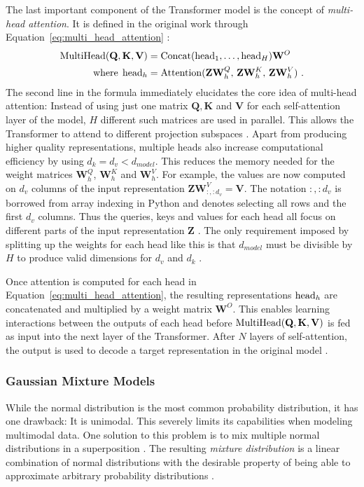 The last important component of the Transformer model is the concept of \emph{multi-head attention}. It is defined in the original work through Equation~\ref{eq:multi_head_attention} \cite{vaswaniAttentionAllYou2017}:
\begin{align}\label{eq:multi_head_attention}
    \operatorname{MultiHead} (\mathbf Q, \mathbf K, \mathbf V) & = \operatorname{Concat} (\operatorname{head}_1, \ldots, \operatorname{head}_H) \mathbf W^O \\
    \text{where} \; \operatorname{head}_h & = \operatorname{Attention} (\mathbf Z \mathbf W^Q_h , \, \mathbf Z \mathbf W^K_h, \, \mathbf Z \mathbf W^V_h)~. \nonumber
\end{align}
The second line in the formula immediately elucidates the core idea of multi-head attention: Instead of using just one matrix $\mathbf Q, \mathbf K$ and $\mathbf V$ for each self-attention layer of the model, $H$ different such matrices are used in parallel. This allows the Transformer to attend to different projection subspaces \cite{vaswaniAttentionAllYou2017}. Apart from producing higher quality representations, multiple heads also increase computational efficiency by using $d_k = d_v < d_{model}$. This reduces the memory needed for the weight matrices $\mathbf W^Q_h$, $\mathbf W^K_h$ and $ \mathbf W^V_h$. For example, the values are now computed on $d_v$ columns of the input representation $\mathbf Z \mathbf W^V_{:, :d_v} = \mathbf V$. The notation $:, :d_v$ is borrowed from array indexing in Python and denotes selecting all rows and the first $d_v$ columns. Thus the queries, keys and values for each head all focus on different parts of the input representation $\mathbf Z$ \cite{vaswaniAttentionAllYou2017}. The only requirement imposed by splitting up the weights for each head like this is that $d_{model}$ must be divisible by $H$ to produce valid dimensions for $d_v$ and $d_k$ \cite{vaswaniAttentionAllYou2017}.

Once attention is computed for each head in Equation~\ref{eq:multi_head_attention}, the resulting representations $\operatorname{head}_h$ are concatenated and multiplied by a weight matrix $\mathbf W^O$. This enables learning interactions between the outputs of each head before $\operatorname{MultiHead} (\mathbf Q, \mathbf K, \mathbf V)$ is fed as input into the next layer of the Transformer. After $N$ layers of self-attention, the output is used to decode a target representation in the original model \cite{vaswaniAttentionAllYou2017}.




\subsubsection{Gaussian Mixture Models}\label{sssec:mixtures}
While the normal distribution is the most common probability distribution, it has one drawback: It is unimodal. This severely limits its capabilities when modeling multimodal data. One solution to this problem is to mix multiple normal distributions in a superposition \cite{bishopPatternRecognitionMachine2006}. The resulting \emph{mixture distribution} is a linear combination of normal distributions with the desirable property of being able to approximate arbitrary probability distributions \cite{bishopMixtureDensityNetworks1994}.


